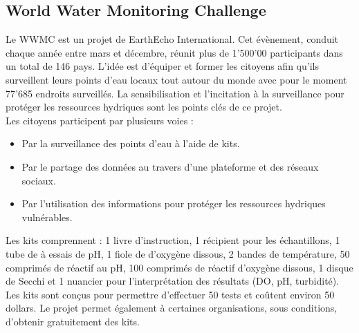 \documentclass[10pt, article]{llncs}
\begin{document}
	\subsection{World Water Monitoring Challenge}
		Le WWMC est un projet de EarthEcho International. Cet évènement, conduit chaque année entre mars et décembre, réunit plus de 1'500'00 participants dans un total de 146 pays. L'idée est d'équiper et former les citoyens afin qu'ils surveillent leurs points d'eau locaux tout autour du monde avec pour le moment 77'685 endroits surveillés. La sensibilisation et l'incitation à la surveillance pour protéger les ressources hydriques sont les points clés de ce projet. \\
		Les citoyens participent par plusieurs voies :
		\begin{itemize}
			\item Par la surveillance des points d'eau à l'aide de kits.
			\item Par le partage des données au travers d'une plateforme et des réseaux sociaux.
			\item Par l'utilisation des informations pour protéger les ressources hydriques vulnérables. 
		\end{itemize}
		Les kits comprennent : 1 livre d'instruction, 1 récipient pour les échantillons, 1 tube de à essais de pH, 1 fiole de d'oxygène dissous, 2 bandes de température, 50 comprimés de réactif au pH, 100 comprimés de réactif d'oxygène dissous, 1 disque de Secchi et 1 nuancier pour l'interprétation des résultats (DO, pH, turbidité). Les kits sont conçus pour permettre d'effectuer 50 tests et coûtent environ 50 dollars. Le projet permet également à certaines organisations, sous conditions, d'obtenir gratuitement des kits.
	
\end{document}
